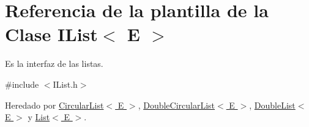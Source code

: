 \hypertarget{classIList}{\section{Referencia de la plantilla de la Clase I\-List$<$ E $>$}
\label{classIList}
}


Es la interfaz de las listas.  




{\ttfamily \#include $<$I\-List.\-h$>$}



Heredado por \hyperlink{classCircularList}{Circular\-List$<$ E $>$}, \hyperlink{classDoubleCircularList}{Double\-Circular\-List$<$ E $>$}, \hyperlink{classDoubleList}{Double\-List$<$ E $>$} y \hyperlink{classList}{List$<$ E $>$}.

